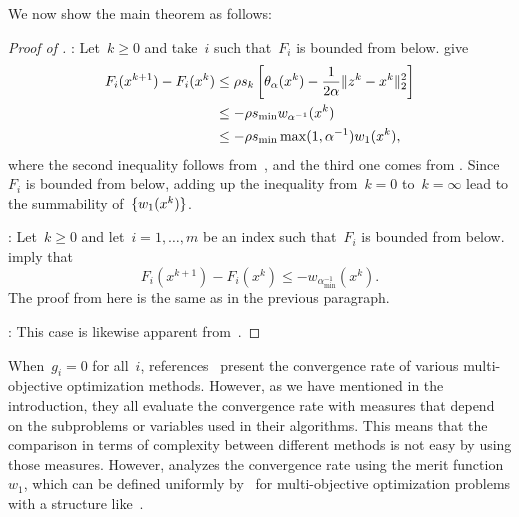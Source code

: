 \documentclass[../../main]{subfiles}
\begin{document}
We now show the main theorem as follows:
\begin{proof}[Proof of ]
    :
    Let~$k \ge 0$ and take~$i$ such that~$F_i$ is bounded from below.
     give
    \begin{align}
        F_i(x^{k + 1}) - F_i(x^k) &\le \rho s_k \left[ \theta_\alpha(x^k) - \frac{1}{2 \alpha} \lVert z^k - x^k\rVert_2^2 \right] \\
                                  &\le - \rho s_{\min} w_{\alpha^{-1}}(x^k) \\
                                  &\le - \rho s_{\min} \max ( 1, \alpha^{-1} ) w_1(x^k)
    ,\end{align}
    where the second inequality follows from~, and the third one comes from .
    Since~$F_i$ is bounded from below, adding up the inequality from~$k = 0$ to~$k = \infty$ lead to the summability of~$\lbrace w_1(x^k)\rbrace$.

    :
    Let~$k \ge 0$ and let~$i = 1, \dots, m$ be an index such that~$F_i$ is bounded from below.
     imply that
    \begin{equation}
        F_i(x^{k + 1}) - F_i(x^k) \le - w_{\alpha_{\min}^{-1}}(x^k)
    .\end{equation} 
    The proof from here is the same as in the previous paragraph.

    :
    This case is likewise apparent from~.
\end{proof}
\begin{remark}
    When~$g_i = 0$ for all~$i$, references~\cite{Calderon2020,Fliege2019,Grapiglia2015} present the convergence rate of various multi-objective optimization methods.
    However, as we have mentioned in the introduction, they all evaluate the convergence rate with measures that depend on the subproblems or variables used in their algorithms.
    This means that the comparison in terms of complexity between different methods is not easy by using those measures.
    However,  analyzes the convergence rate using the merit function~$w_1$, which can be defined uniformly by~ for multi-objective optimization problems with a structure like~.
\end{remark}
\end{document}

